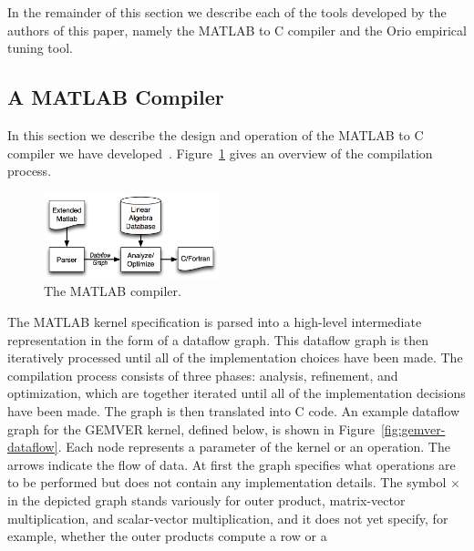 \documentclass[runningheads]{llncs}
\begin{document}

In the remainder of this section we describe each of the tools developed by the authors of this paper, namely the MATLAB to C compiler and the Orio empirical tuning tool.

\subsection{A MATLAB Compiler}
\label{sec:matlab}
%
In this section we describe the design and operation of the MATLAB to C compiler we have developed~\cite{Siek}.    Figure~\ref{fig:compiler} gives an overview of the compilation process. 
%
\begin{figure}
\vspace{-.2in}
\centering
\includegraphics[width=2in]{figures/compile.png}
\caption{The MATLAB compiler.}
\label{fig:compiler}
\vspace{-.3in}
\end{figure}
The MATLAB kernel specification is parsed into a high-level intermediate
representation in the form of a dataflow graph.  This dataflow graph is then
iteratively processed until all of the implementation choices have been made.
The compilation process consists of three phases: analysis, refinement, and
optimization, which are together iterated until all of the implementation
decisions have been made.  The graph is then translated into C code.
%
An example dataflow graph for the GEMVER kernel, defined below, is shown
in Figure~\ref{fig:gemver-dataflow}.
Each node represents a parameter of the kernel or an operation.  The arrows
indicate the flow of data. At first the graph specifies what operations are
to be performed but does not contain any implementation details. The symbol
$\times$ in the depicted graph stands variously for outer product,
matrix-vector multiplication, and scalar-vector multiplication, and it does
not yet specify, for example, whether the outer products compute a row or a
\end{document}
